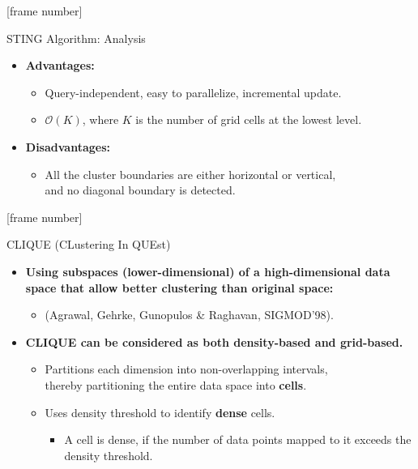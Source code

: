 \documentclass[aspectratio=169,t,xcolor=dvipsnames]{beamer}
\begin{document}
  {
    [frame number]
    \begin{frame}{STING Algorithm: Analysis}
      \begin{itemize}
        \item \textbf{Advantages:}
        \begin{itemize}
          \item Query-independent, easy to parallelize, incremental update.
          \item $\mathcal{O}(K)$, where $K$ is the number of grid cells at the lowest level.
        \end{itemize}
        \item \textbf{Disadvantages:}
        \begin{itemize}
          \item All the cluster boundaries are either horizontal or vertical, \\
          and no diagonal boundary is detected.
        \end{itemize}
      \end{itemize}
    \end{frame}
  }

  {
    [frame number]
    \begin{frame}{CLIQUE (CLustering In QUEst)}
      \begin{itemize}
        \item \textbf{Using {\color{airforceblue}subspaces} (lower-dimensional) of a high-dimensional data space that allow better clustering than original space:}
        \begin{itemize}
          \item (Agrawal, Gehrke, Gunopulos \& Raghavan, SIGMOD'98).
        \end{itemize}
        \item \textbf{CLIQUE can be considered as both density-based and grid-based.}
        \begin{itemize}
          \item Partitions each dimension into non-overlapping intervals, \\
          thereby partitioning the entire data space into \textbf{cells}.
          \item Uses density threshold to identify \textbf{dense} cells.
          \begin{itemize}
            \item A cell is dense, if the number of data points mapped to it exceeds the density threshold.
          \end{itemize}
        \end{itemize}
      \end{itemize}
    \end{frame}
  }
\end{document}
